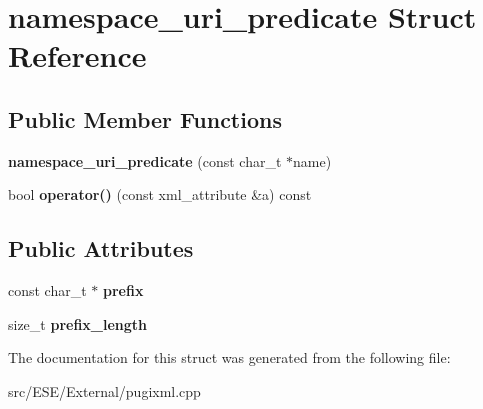 \hypertarget{structnamespace__uri__predicate}{\section{namespace\-\_\-uri\-\_\-predicate Struct Reference}
\label{structnamespace__uri__predicate}
}
\subsection*{Public Member Functions}
\begin{DoxyCompactItemize}
\item 
\hypertarget{structnamespace__uri__predicate_a25bef9c1e12b0fdc908275ae7ab7c202}{{\bfseries namespace\-\_\-uri\-\_\-predicate} (const char\-\_\-t $\ast$name)}\label{structnamespace__uri__predicate_a25bef9c1e12b0fdc908275ae7ab7c202}

\item 
\hypertarget{structnamespace__uri__predicate_ab4580e45d603d3eedfe75fec74210ce1}{bool {\bfseries operator()} (const xml\-\_\-attribute \&a) const }\label{structnamespace__uri__predicate_ab4580e45d603d3eedfe75fec74210ce1}

\end{DoxyCompactItemize}
\subsection*{Public Attributes}
\begin{DoxyCompactItemize}
\item 
\hypertarget{structnamespace__uri__predicate_a80a2c051b9e57b8895c28d8fcc32e051}{const char\-\_\-t $\ast$ {\bfseries prefix}}\label{structnamespace__uri__predicate_a80a2c051b9e57b8895c28d8fcc32e051}

\item 
\hypertarget{structnamespace__uri__predicate_aa48279192e8d48b9c798f5485a2a9170}{size\-\_\-t {\bfseries prefix\-\_\-length}}\label{structnamespace__uri__predicate_aa48279192e8d48b9c798f5485a2a9170}

\end{DoxyCompactItemize}


The documentation for this struct was generated from the following file\-:\begin{DoxyCompactItemize}
\item 
src/\-E\-S\-E/\-External/pugixml.\-cpp\end{DoxyCompactItemize}
